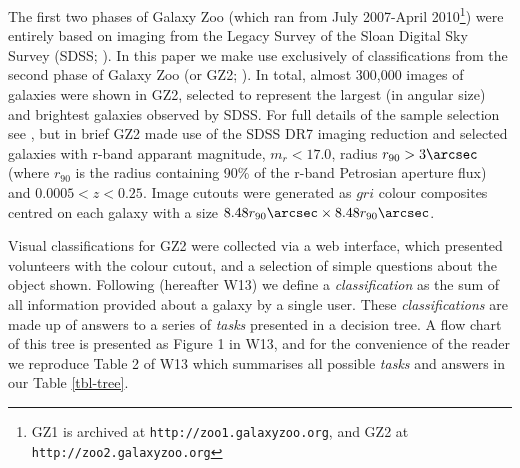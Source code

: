 \documentclass[usenatbib]{mn2e}
\begin{document}
The first two phases of Galaxy Zoo (which ran from July 2007-April 2010\footnote{GZ1 is archived at {\tt http://zoo1.galaxyzoo.org}, and GZ2 at {\tt http://zoo2.galaxyzoo.org}}) were entirely based on imaging from the Legacy Survey of the Sloan Digital Sky Survey (SDSS; \citealt{York2000}). In this paper we make use exclusively of classifications from the second phase of Galaxy Zoo (or GZ2; \citealt{Willett2013}). In total, almost 300,000 images of galaxies were shown in GZ2, selected to represent the largest (in angular size) and brightest galaxies observed by SDSS. For full details of the sample selection see \citet{Willett2013}, but in brief GZ2 made use of the SDSS DR7 imaging reduction \citep{DR7} and selected galaxies with r-band apparant magnitude, $m_r<17.0$, radius $r_{90}>3\arcsec$ (where $r_{90}$ is the radius containing 90\% of the r-band Petrosian aperture flux) and $0.0005<z<0.25$. Image cutouts were generated as $gri$ colour composites centred on each galaxy with a size $8.48r_{90}\arcsec \times 8.48r_{90}\arcsec$. 

Visual classifications for GZ2 were collected via a web interface, which presented volunteers with the colour cutout, and a selection of simple questions about the object shown. Following \citet{Willett2013} (hereafter W13) we define a {\it classification} as the sum of all information provided about a galaxy by a single user. These {\it classifications} are made up of answers to a series of {\it tasks} presented in a decision tree. A flow chart of this tree is presented as Figure 1 in W13, and for the convenience of the reader we reproduce Table 2 of W13 which summarises all possible {\it tasks} and answers in our Table \ref{tbl-tree}. 
\end{document}
